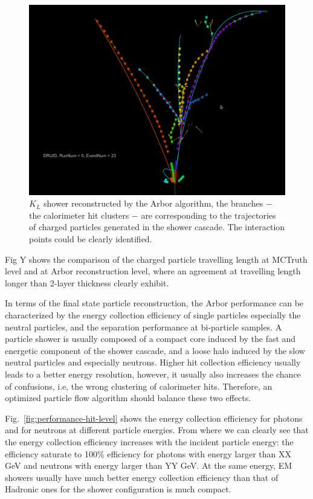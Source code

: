\begin{figure}[h!]
\centering
\includegraphics[scale=0.36]{Figures/Performance/arbor/ArborPrinciple-eps-converted-to.pdf}
\caption{ $K_L$ shower reconstructed by the Arbor algorithm, the branches $-$ the calorimeter hit clusters $-$ are corresponding to the trajectories of charged particles generated in the shower cascade. The interaction points could be clearly identified.}
\label{fig:arbor-principle}
\end{figure}



 
Fig Y shows the comparison of the charged particle travelling length at MCTruth level and at Arbor reconstruction level,
where an agreement at travelling length longer than 2-layer thickness clearly exhibit.


In terms of the final state particle reconstruction,
the Arbor performance can be characterized by the energy collection efficiency of single particles especially the neutral particles,
and the separation performance at bi-particle samples.
A particle shower is usually composed of a compact core induced by the fast and energetic component of the shower cascade,
and a loose halo induced by the slow neutral particles and especially neutrons.
Higher hit collection efficiency usually leads to a better energy resolution,
however, it usually also increases the chance of confusions,
i.e, the wrong clustering of calorimeter hits.
Therefore, an optimized particle flow algorithm should balance these two effects. 

Fig.~\ref{fig:performance-hit-level} shows the energy collection efficiency for photons and for neutrons at different particle energies. From where we can clearly see that the energy collection efficiency increases with the incident particle energy: the efficiency saturate to 100\% efficiency for photons with energy larger than XX GeV and neutrons with energy larger than YY GeV. At the same energy, EM showers usually have much better energy collection efficiency than that of Hadronic ones for the shower configuration is much compact. 


